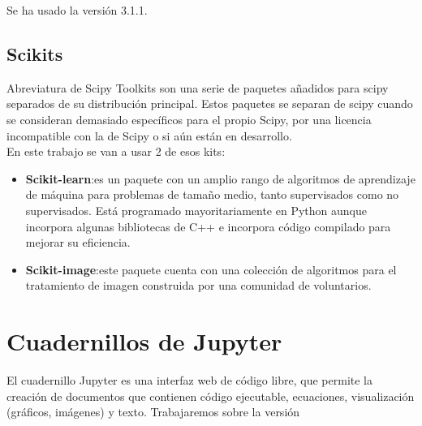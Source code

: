 \documentclass[a4paper,12pt]{report}
\begin{document}
Se ha usado la versión 3.1.1.\\

\subsection{Scikits}

Abreviatura de Scipy Toolkits son una serie de paquetes añadidos para scipy separados de su distribución principal. Estos paquetes se separan de scipy cuando se consideran demasiado específicos para el propio Scipy, por una licencia incompatible con la de Scipy o si aún están en desarrollo.\\

En este trabajo se van a usar 2 de esos kits:\\


\begin{itemize}

	\item \textbf{Scikit-learn}:es un paquete con un amplio rango de algoritmos de aprendizaje de máquina para problemas de tamaño medio, tanto supervisados como no supervisados. Está programado mayoritariamente en Python aunque incorpora algunas bibliotecas de C++ e incorpora código compilado para mejorar su eficiencia.

	\item \textbf{Scikit-image}:este paquete cuenta con una colección de algoritmos para el tratamiento de imagen construida por una comunidad de voluntarios.
\end{itemize}
\section{ Cuadernillos de Jupyter}

El cuadernillo Jupyter es una interfaz web de código libre, que permite la creación de documentos que contienen código ejecutable, ecuaciones, visualización (gráficos, imágenes) y texto. Trabajaremos sobre la versión \\
\end{document}
